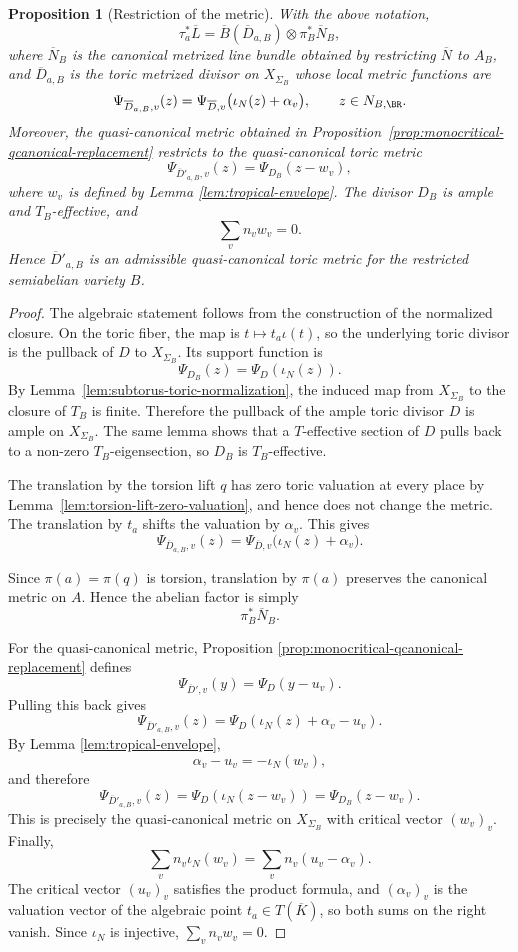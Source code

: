 \documentclass[10pt,a4paper]{amsart}
\theoremstyle{plain}
\newtheorem{proposition}[theorem]{Proposition}
\theoremstyle{plain}
\numberwithin{equation}{section}
\providecommand{\bD}{\overline{D}}
\providecommand{\bL}{\overline{L}}
\providecommand{\bN}{\overline{N}}
\begin{document}
\begin{proposition}[Restriction of the metric]\label{prop:restriction-metric}
	With the above notation,
	\[
	\tau_a^*\bL
	=
	\overline B(\bD_{a,B})\otimes\pi_B^*\bN_B,
	\]
	where \(\bN_B\) is the canonical metrized line bundle obtained by restricting
	\(\bN\) to \(A_B\), and \(\bD_{a,B}\) is the toric metrized divisor on
	\(X_{\Sigma_B}\) whose local metric functions are
	\[
	\Psi_{\bD_{a,B},v}(z)
	=
	\Psi_{\bD,v}\bigl(\iota_N(z)+\alpha_v\bigr),
	\qquad z\in N_{B,\BR}.
	\]
	Moreover, the quasi-canonical metric obtained in
	Proposition~\ref{prop:monocritical-qcanonical-replacement} restricts to the
	quasi-canonical toric metric
	\[
	\Psi_{\bD'_{a,B},v}(z)
	=
	\Psi_{D_B}(z-w_v),
	\]
	where \(w_v\) is defined by Lemma \ref{lem:tropical-envelope}.
	The divisor \(D_B\) is ample and \(T_B\)-effective, and
	\[
	\sum_v n_vw_v=0.
	\]
	Hence \(\bD'_{a,B}\) is an admissible quasi-canonical toric metric for the
	restricted semiabelian variety \(B\).
\end{proposition}

\begin{proof}
	The algebraic statement follows from the construction of the normalized closure.
	On the toric fiber, the map is \(t\mapsto t_a\iota(t)\), so the underlying
	toric divisor is the pullback of \(D\) to \(X_{\Sigma_B}\).  Its support
	function is
	\[
	\Psi_{D_B}(z)=\Psi_D(\iota_N(z)).
	\]
	By Lemma~\ref{lem:subtorus-toric-normalization}, the induced map from
	\(X_{\Sigma_B}\) to the closure of \(T_B\) is finite.  Therefore the pullback
	of the ample toric divisor \(D\) is ample on \(X_{\Sigma_B}\).  The same lemma
	shows that a \(T\)-effective section of \(D\) pulls back to a non-zero
	\(T_B\)-eigensection, so \(D_B\) is \(T_B\)-effective.
	
	The translation by the torsion lift \(q\) has zero toric valuation at every
	place by Lemma~\ref{lem:torsion-lift-zero-valuation}, and hence does not change
	the metric.  The translation by \(t_a\) shifts the valuation by \(\alpha_v\).  This
	gives
	\[
	\Psi_{\bD_{a,B},v}(z)
	=
	\Psi_{\bD,v}\bigl(\iota_N(z)+\alpha_v\bigr).
	\]
	
	Since \(\pi(a)=\pi(q)\) is torsion, translation by \(\pi(a)\) preserves the
	canonical metric on \(A\).  Hence the abelian factor is simply
	\[
	\pi_B^*\bN_B.
	\]
	
	For the quasi-canonical metric, Proposition
	\ref{prop:monocritical-qcanonical-replacement} defines
	\[
	\Psi_{\bD',v}(y)=\Psi_D(y-u_v).
	\]
	Pulling this back gives
	\[
	\Psi_{\bD'_{a,B},v}(z)
	=
	\Psi_D(\iota_N(z)+\alpha_v-u_v).
	\]
	By Lemma \ref{lem:tropical-envelope},
	\[
	\alpha_v-u_v=-\iota_N(w_v),
	\]
	and therefore
	\[
	\Psi_{\bD'_{a,B},v}(z)
	=
	\Psi_D(\iota_N(z-w_v))
	=
	\Psi_{D_B}(z-w_v).
	\]
	This is precisely the quasi-canonical metric on \(X_{\Sigma_B}\) with critical
	vector \((w_v)_v\).  Finally,
	\[
	\sum_vn_v\iota_N(w_v)
	=
	\sum_vn_v(u_v-\alpha_v).
	\]
	The critical vector \((u_v)_v\) satisfies the product formula, and
	\((\alpha_v)_v\) is the valuation vector of the algebraic point
	\(t_a\in T(\overline K)\), so both sums on the right vanish.  Since
	\(\iota_N\) is injective, \(\sum_vn_vw_v=0\).
\end{proof}
\end{document}
